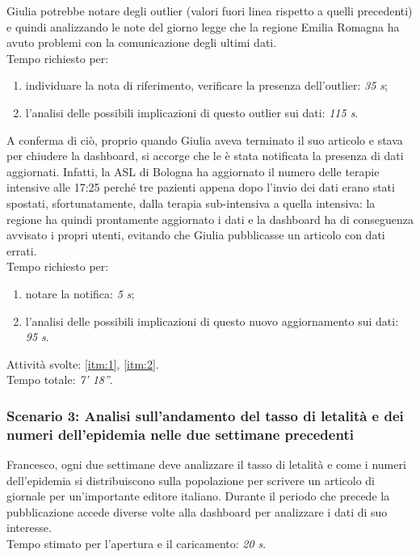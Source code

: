 Giulia potrebbe notare degli outlier (valori fuori linea rispetto a quelli precedenti) e quindi analizzando le note del giorno legge che la regione Emilia Romagna ha avuto problemi con la comunicazione degli ultimi dati.\\
Tempo richiesto per:
\begin{enumerate}
    \item individuare la nota di riferimento, verificare la presenza dell'outlier: \textit{35 s};
    \item l'analisi delle possibili implicazioni di questo outlier sui dati: \textit{115 s}.
\end{enumerate}

A conferma di ciò, proprio quando Giulia aveva terminato il suo articolo e stava per chiudere la dashboard, si accorge che le è stata notificata la presenza di dati aggiornati. Infatti, la ASL di Bologna ha aggiornato il numero delle terapie intensive alle 17:25 perché tre pazienti appena dopo l'invio dei dati erano stati spostati, sfortunatamente, dalla terapia sub-intensiva a quella intensiva: la regione ha quindi prontamente aggiornato i dati e la dashboard ha di conseguenza avvisato i propri utenti, evitando che Giulia pubblicasse un articolo con dati errati.\\
Tempo richiesto per:
\begin{enumerate}
    \item notare la notifica: \textit{5 s};
    \item l'analisi delle possibili implicazioni di questo nuovo aggiornamento sui dati: \textit{95 s}.
\end{enumerate}
\noindent
Attività svolte: \ref{itm:1}, \ref{itm:2}.\\  
Tempo totale: \textit{7' 18''}. 

\subsubsection*{Scenario 3: Analisi sull'andamento del tasso di letalità e dei numeri dell'epidemia nelle due settimane precedenti}
Francesco, ogni due settimane deve analizzare il tasso di letalità e come i numeri dell’epidemia si distribuiscono sulla popolazione per scrivere un articolo di giornale per un’importante editore italiano. Durante il periodo che precede la pubblicazione accede diverse volte alla dashboard per analizzare i dati di suo interesse.\\
Tempo stimato per l'apertura e il caricamento: \textit{20 s}. 


